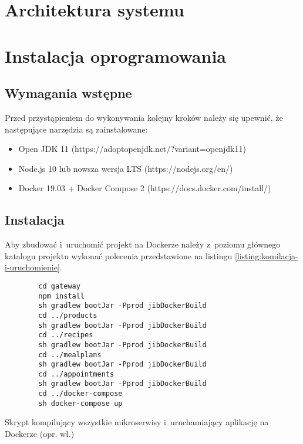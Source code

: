 \section{Architektura systemu}\label{sec:system-architecture}
\section{Instalacja oprogramowania}\label{sec:software-installation}
\subsection{Wymagania wstępne}\label{subsec:prerequirements}
Przed przystąpieniem do wykonywania kolejny kroków należy się upewnić, że następujące narzędzia są zainstalowane:
\begin{itemize}
    \item Open JDK 11 (https://adoptopenjdk.net/?variant=openjdk11)
    \item Node.js 10 lub nowsza wersja LTS (https://nodejs.org/en/)
    \item Docker 19.03 + Docker Compose 2 (https://docs.docker.com/install/)
\end{itemize}

\subsection{Instalacja}\label{subsec:installation}

Aby zbudować i~uruchomić projekt na Dockerze należy z~poziomu głównego katalogu projektu
wykonać polecenia przedstawione na listingu \ref{listing:komilacja-i-uruchomienie}.
\begin{listing}[h!]
    \begin{verbatim}
        cd gateway
        npm install
        sh gradlew bootJar -Pprod jibDockerBuild
        cd ../products
        sh gradlew bootJar -Pprod jibDockerBuild
        cd ../recipes
        sh gradlew bootJar -Pprod jibDockerBuild
        cd ../mealplans
        sh gradlew bootJar -Pprod jibDockerBuild
        cd ../appointments
        sh gradlew bootJar -Pprod jibDockerBuild
        cd ../docker-compose
        sh docker-compose up
    \end{verbatim}
    \caption{Skrypt kompilujący wszystkie mikroserwisy i~uruchamiający aplikację na Dockerze (opr. wł.)} \label{listing:komilacja-i-uruchomienie}
\end{listing}

